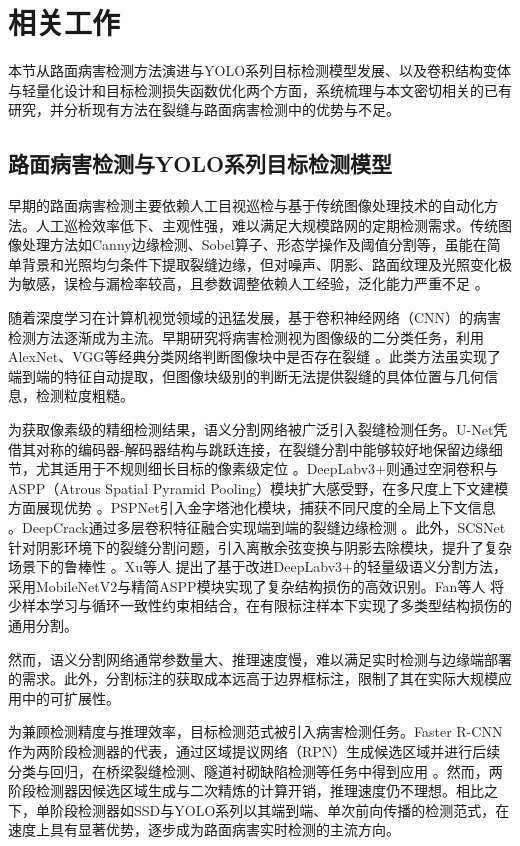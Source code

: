 \documentclass[twocolumn]{sn-jnl}
\begin{document}
\section{相关工作}
本节从路面病害检测方法演进与YOLO系列目标检测模型发展、以及卷积结构变体与轻量化设计和目标检测损失函数优化两个方面，系统梳理与本文密切相关的已有研究，并分析现有方法在裂缝与路面病害检测中的优势与不足。

\subsection{路面病害检测与YOLO系列目标检测模型}
早期的路面病害检测主要依赖人工目视巡检与基于传统图像处理技术的自动化方法。人工巡检效率低下、主观性强，难以满足大规模路网的定期检测需求。传统图像处理方法如Canny边缘检测、Sobel算子、形态学操作及阈值分割等，虽能在简单背景和光照均匀条件下提取裂缝边缘，但对噪声、阴影、路面纹理及光照变化极为敏感，误检与漏检率较高，且参数调整依赖人工经验，泛化能力严重不足 \cite{Dorafshan2018}。

随着深度学习在计算机视觉领域的迅猛发展，基于卷积神经网络（CNN）的病害检测方法逐渐成为主流。早期研究将病害检测视为图像级的二分类任务，利用AlexNet、VGG等经典分类网络判断图像块中是否存在裂缝 \cite{Ali2021}。此类方法虽实现了端到端的特征自动提取，但图像块级别的判断无法提供裂缝的具体位置与几何信息，检测粒度粗糙。

为获取像素级的精细检测结果，语义分割网络被广泛引入裂缝检测任务。U-Net凭借其对称的编码器-解码器结构与跳跃连接，在裂缝分割中能够较好地保留边缘细节，尤其适用于不规则细长目标的像素级定位 \cite{Ronneberger2015}。DeepLabv3+则通过空洞卷积与ASPP（Atrous Spatial Pyramid Pooling）模块扩大感受野，在多尺度上下文建模方面展现优势 \cite{Chen2017}。PSPNet引入金字塔池化模块，捕获不同尺度的全局上下文信息 \cite{Zhao2017}。DeepCrack通过多层卷积特征融合实现端到端的裂缝边缘检测 \cite{Zou2018}。此外，SCSNet针对阴影环境下的裂缝分割问题，引入离散余弦变换与阴影去除模块，提升了复杂场景下的鲁棒性 \cite{Zhang2024}。Xu等人 \cite{Xu2023} 提出了基于改进DeepLabv3+的轻量级语义分割方法，采用MobileNetV2与精简ASPP模块实现了复杂结构损伤的高效识别。Fan等人 \cite{Fan2024} 将少样本学习与循环一致性约束相结合，在有限标注样本下实现了多类型结构损伤的通用分割。

然而，语义分割网络通常参数量大、推理速度慢，难以满足实时检测与边缘端部署的需求。此外，分割标注的获取成本远高于边界框标注，限制了其在实际大规模应用中的可扩展性。

为兼顾检测精度与推理效率，目标检测范式被引入病害检测任务。Faster R-CNN作为两阶段检测器的代表，通过区域提议网络（RPN）生成候选区域并进行后续分类与回归，在桥梁裂缝检测、隧道衬砌缺陷检测等任务中得到应用 \cite{Tang2019, Deng2020, Li2021}。然而，两阶段检测器因候选区域生成与二次精炼的计算开销，推理速度仍不理想。相比之下，单阶段检测器如SSD与YOLO系列以其端到端、单次前向传播的检测范式，在速度上具有显著优势，逐步成为路面病害实时检测的主流方向。
\end{document}
